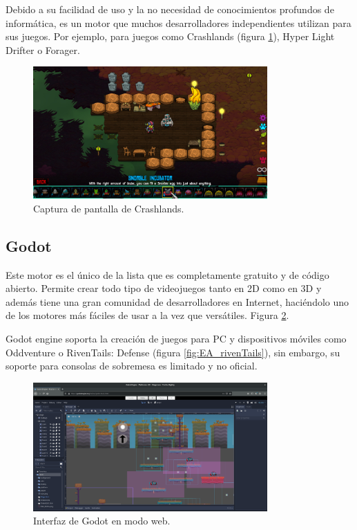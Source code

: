 Debido a su facilidad de uso y la no necesidad de conocimientos profundos de informática, es un motor que muchos desarrolladores independientes utilizan para sus juegos. Por ejemplo, para juegos como Crashlands (figura \ref{fig:EA_crashlands}), Hyper Light Drifter o Forager.



\begin{figure}
  \centering
\includegraphics[width=0.8\textwidth]{03.EstudioProblema/01.EstadoArte/00.Figuras/31.crashlands.jpg}
    \caption{Captura de pantalla de Crashlands. \cite{EA_img_crashlands}}
    \label{fig:EA_crashlands}
\end{figure}


\subsection{Godot}

Este motor es el único de la lista que es completamente gratuito y de código abierto. Permite crear todo tipo de videojuegos tanto en 2D como en 3D y además tiene una gran comunidad de desarrolladores en Internet, haciéndolo uno de los motores más fáciles de usar a la vez que versátiles. \cite{EA_engine_godot} Figura \ref{fig:EA_godot}.

Godot engine soporta la creación de juegos para PC y dispositivos móviles como Oddventure o RivenTails: Defense (figura \ref{fig:EA_rivenTails}), sin embargo, su soporte para consolas de sobremesa es limitado y no oficial.


\begin{figure}[H]
  \centering
\includegraphics[width=0.8\textwidth]{03.EstudioProblema/01.EstadoArte/00.Figuras/32.interfaz_godot.png}
    \caption{Interfaz de Godot en modo web. \cite{EA_img_godot}}
    \label{fig:EA_godot}
\end{figure}

